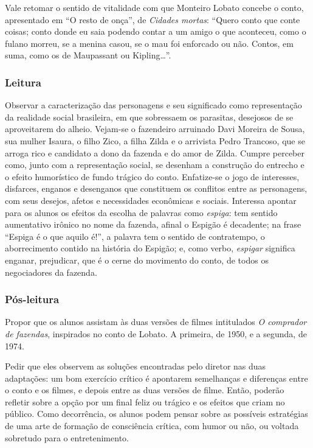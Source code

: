 \documentclass[12pt]{extarticle}
\begin{document}
Vale retomar o sentido de vitalidade com que Monteiro Lobato concebe o
conto, apresentado em ``O resto de onça'', de \emph{Cidades mortas}:
``Quero conto que conte coisas; conto donde eu saia podendo contar a um
amigo o que aconteceu, como o fulano morreu, se a menina casou, se o mau
foi enforcado ou não. Contos, em suma, como os de Maupassant ou
Kipling\ldots{}''.

\subsubsection{Leitura}

Observar a caracterização das personagens e seu significado como
representação da realidade social brasileira, em que sobressaem os
parasitas, desejosos de se aproveitarem do alheio. Vejam-se o fazendeiro
arruinado Davi Moreira de Sousa, sua mulher Isaura, o filho Zico, a
filha Zilda e o arrivista Pedro Trancoso, que se arroga rico e candidato
a dono da fazenda e do amor de Zilda. Cumpre perceber como, junto com a
representação social, se desenham a construção do entrecho e o efeito
humorístico de fundo trágico do conto. Enfatize-se o jogo de interesses,
disfarces, enganos e desenganos que constituem os conflitos entre as
personagens, com seus desejos, afetos e necessidades econômicas e
sociais. Interessa apontar para os alunos os efeitos da escolha de
palavras como \emph{espiga}: tem sentido aumentativo irônico no nome da
fazenda, afinal o Espigão é decadente; na frase ``Espiga é o que aquilo
é!'', a palavra tem o sentido de contratempo, o aborrecimento contido na
história do Espigão; e, como verbo, \emph{espigar} significa enganar,
prejudicar, que é o cerne do movimento do conto, de todos os
negociadores da fazenda.

\subsubsection{Pós-leitura}

Propor que os alunos assistam às duas versões de filmes intitulados
\emph{O comprador de fazendas}, inspirados no conto de Lobato. A
primeira, de 1950, e a segunda, de 1974.

Pedir que eles observem as soluções encontradas pelo diretor nas duas
adaptações: um bom exercício crítico é apontarem semelhanças e
diferenças entre o conto e os filmes, e depois entre as duas versões de
filme. Então, poderão refletir sobre a opção por um final feliz ou
trágico e os efeitos que criam no público. Como decorrência, os alunos
podem pensar sobre as possíveis estratégias de uma arte de formação de
consciência crítica, com humor ou não, ou voltada sobretudo para o
entretenimento.
\end{document}

